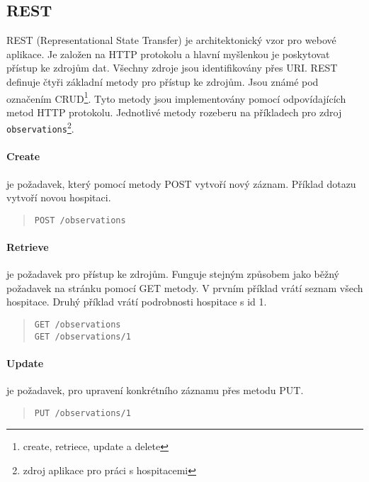\subsection{REST}
\label{rest}
REST (Representational State Transfer) \cite{rest} je architektonický vzor pro webové aplikace. Je založen na HTTP protokolu a hlavní myšlenkou je poskytovat přístup ke zdrojům dat. Všechny zdroje jsou identifikovány přes URI. REST definuje čtyři základní metody pro přístup ke zdrojům. Jsou známé pod označením CRUD\footnote{create, retriece, update a delete}. Tyto metody jsou implementovány pomocí odpovídajících metod HTTP protokolu. Jednotlivé metody rozeberu na příkladech pro zdroj \verb|observations|\footnote{zdroj aplikace pro práci s hospitacemi}.

\paragraph*{Create}
je požadavek, který pomocí metody POST vytvoří nový záznam. Příklad dotazu vytvoří novou hospitaci.

\begin{quote}
\begin{verbatim}
POST /observations
\end{verbatim} 
\end{quote}

\paragraph*{Retrieve}
je požadavek pro přístup ke zdrojům. Funguje stejným způsobem jako běžný požadavek na stránku pomocí GET metody. V prvním příklad vrátí seznam všech hospitace. Druhý příklad vrátí podrobnosti hospitace s id 1.

\begin{quote}
\begin{verbatim}
GET /observations
GET /observations/1
\end{verbatim} 
\end{quote}
 
\paragraph*{Update}
je požadavek, pro upravení konkrétního záznamu přes metodu PUT. 

\begin{quote}
\begin{verbatim}
PUT /observations/1
\end{verbatim} 
\end{quote}

